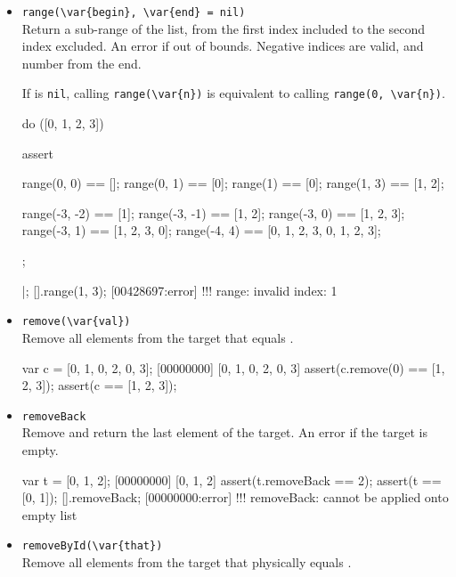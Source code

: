 \begin{itemize}

\item \lstinline|range(\var{begin}, \var{end} = nil)|\\
  Return a sub-range of the list, from the first index included to the
  second index excluded.  An error if out of bounds.  Negative indices
  are valid, and number from the end.

  If  is \lstinline|nil|, calling \lstinline|range(\var{n})|
  is equivalent to calling \lstinline|range(0, \var{n})|.

\begin{urbiscript}
do ([0, 1, 2, 3])
{
  assert
  {
    range(0, 0)   == [];
    range(0, 1)   == [0];
    range(1)      == [0];
    range(1, 3)   == [1, 2];

    range(-3, -2) == [1];
    range(-3, -1) == [1, 2];
    range(-3, 0)  == [1, 2, 3];
    range(-3, 1)  == [1, 2, 3, 0];
    range(-4, 4)  == [0, 1, 2, 3, 0, 1, 2, 3];
  };
}|;
[].range(1, 3);
[00428697:error] !!! range: invalid index: 1
\end{urbiscript}

\item \lstinline|remove(\var{val})|\\
  Remove all elements from the target that equals .

\begin{urbiscript}
var c = [0, 1, 0, 2, 0, 3];
[00000000] [0, 1, 0, 2, 0, 3]
assert(c.remove(0) == [1, 2, 3]);
assert(c == [1, 2, 3]);
\end{urbiscript}

\item \lstinline|removeBack|\\
  Remove and return the last element of the target. An error if the
  target is empty.

\begin{urbiscript}
var t = [0, 1, 2];
[00000000] [0, 1, 2]
assert(t.removeBack == 2);
assert(t == [0, 1]);
[].removeBack;
[00000000:error] !!! removeBack: cannot be applied onto empty list
\end{urbiscript}

\item \lstinline|removeById(\var{that})|\\
  Remove all elements from the target that physically equals
  .


\end{itemize}
